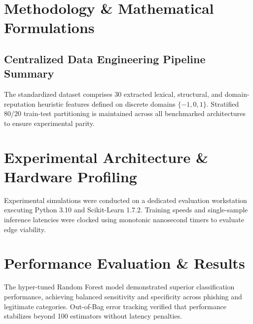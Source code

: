 \documentclass[conference]{IEEEtran}
\begin{document}
\section{Methodology \& Mathematical Formulations}
\label{sec:methodology}

\subsection{Centralized Data Engineering Pipeline Summary}
The standardized dataset comprises 30 extracted lexical, structural, and domain-reputation heuristic features defined on discrete domains $\{-1, 0, 1\}$. Stratified 80/20 train-test partitioning is maintained across all benchmarked architectures to ensure experimental parity.



\section{Experimental Architecture \& Hardware Profiling}
\label{sec:hardware_eval}
Experimental simulations were conducted on a dedicated evaluation workstation executing Python 3.10 and Scikit-Learn 1.7.2. Training speeds and single-sample inference latencies were clocked using monotonic nanosecond timers to evaluate edge viability.

\section{Performance Evaluation \& Results}
\label{sec:results}
The hyper-tuned Random Forest model demonstrated superior classification performance, achieving balanced sensitivity and specificity across phishing and legitimate categories. Out-of-Bag error tracking verified that performance stabilizes beyond 100 estimators without latency penalties.





\end{document}
